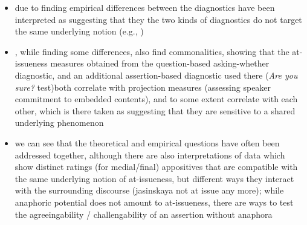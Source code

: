 \documentclass[times,linguex,xcolor]{glossa}
\begin{document}
  \begin{itemize}
    \item due to finding empirical differences between the diagnostics have been interpreted as suggesting that they the two kinds of diagnostics do not target the same underlying notion (e.g., \citealt{snider_anaphoric_2017,snider_distinguishing_2018,koev_notions_2018,faller_discourse_2019,korotkova_evidential_2020})

    \item \citealt{tonhauser_how_2018}, while finding some differences, also find commonalities, showing that the at-issueness measures obtained from the question-based asking-whether diagnostic, and an additional assertion-based diagnostic used there (\emph{Are you sure?} test)both correlate with projection measures (assessing speaker commitment to embedded contents), and to some extent correlate with each other, which is there taken as suggesting that they are sensitive to a shared underlying phenomenon

    \item we can see that the theoretical and empirical questions have often been addressed together, although there are also interpretations of data which show distinct ratings (for medial/final) appositives that are compatible with the same underlying notion of at-issueness, but different ways they interact with the surrounding discourse (jasinskaya not at issue any more); while anaphoric potential does not amount to at-issueness, there are ways to test the agreeingability / challengability of an assertion without anaphora

  \end{itemize}
\end{document}
